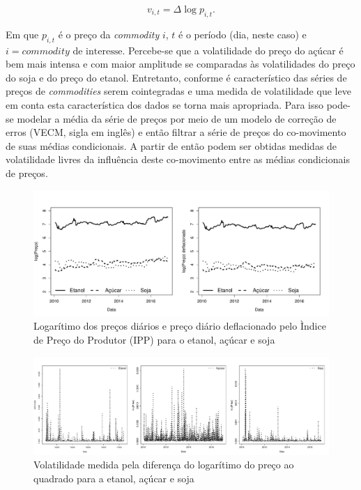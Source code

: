 \begin{equation}
v_{i,t} =\Delta \log p_{i,t}.
\end{equation}

Em que \(p_{i,t}\) é o preço da \emph{commodity} \(i\), \(t\) é o
período (dia, neste caso) e \(i = commodity \text{ de interesse}\).
Percebe-se que a volatilidade do preço do açúcar é bem mais intensa e
com maior amplitude se comparadas às volatilidades do preço do soja e do
preço do etanol. Entretanto, conforme  é
característico das séries de preços de \emph{commodities} serem
cointegradas e uma medida de volatilidade que leve em conta esta
característica dos dados se torna mais apropriada. Para isso pode-se
modelar a média da série de preços por meio de um modelo de correção de
erros (VECM, sigla em inglês) e então filtrar a série de preços do
co-movimento de suas médias condicionais. A partir de então podem ser
obtidas medidas de volatilidade livres da influência deste co-movimento
entre as médias condicionais de preços.

\begin{figure}[htbp]
\centering
\includegraphics{grafico1-1.pdf}
\caption{Logarítimo dos preços diários e preço diário deflacionado pelo
Ìndice de Preço do Produtor (IPP) para o etanol, açúcar e soja}
\end{figure}

\begin{figure}[htbp]
\centering
\includegraphics{grafico2-1.pdf}
\caption{Volatilidade medida pela diferença do logarítimo do preço ao
quadrado para a etanol, açúcar e soja}
\end{figure}

